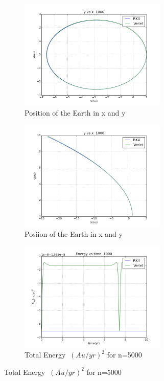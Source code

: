 \documentclass[11pt,a4wide]{article}
\begin{document}
\begin{figure}[H]
\begin{subfigure}[b]{0.5\linewidth}
    \centering
    \includegraphics[width=70mm]{Ellipse.png}
    \caption{Position of the Earth in x and y} 
    \label{fig7:a} 
    \vspace{4ex}
\end{subfigure}%
\begin{subfigure}[b]{0.5\linewidth}
    \centering
    \includegraphics[width=70mm]{Escape.png}
    \caption{Posiion of the Earth in x and y} 
    \label{fig7:b} 
    \vspace{4ex}
\end{subfigure}
\begin{subfigure}[b]{0.5\linewidth}
    \centering
    \includegraphics[width=70mm]{EEllipse.png}
    \caption{Total Energy $\ (Au/yr)^2$ for n=5000} 

\end{subfigure}
\end{figure}
\end{document}
